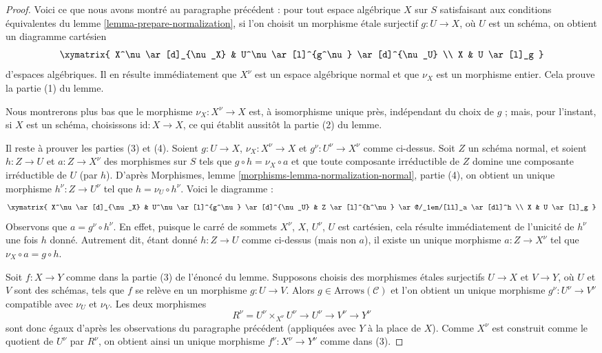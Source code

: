 \begin{proof}
\medskip\noindent
Voici ce que nous avons montré au paragraphe précédent : pour tout espace
algébrique $X$ sur $S$ satisfaisant aux conditions équivalentes du
lemme \ref{lemma-prepare-normalization}, si l'on choisit un morphisme étale
surjectif $g : U \to X$, où $U$ est un schéma, on obtient
un diagramme cartésien
$$
\xymatrix{
X^\nu \ar[d]_{\nu_X} & U^\nu \ar[l]^{g^\nu} \ar[d]^{\nu_U} \\
X & U \ar[l]_g
}
$$
d'espaces algébriques. Il en résulte immédiatement que $X^\nu$ est un espace
algébrique normal et que $\nu_X$ est un morphisme entier. Cela prouve
la partie (1) du lemme.

\medskip\noindent
Nous montrerons plus bas que le morphisme $\nu_X : X^\nu \to X$
est, à isomorphisme unique près, indépendant du choix de $g$ ;
mais, pour l'instant, si $X$ est un schéma, choisissons $\text{id} : X \to X$,
ce qui établit aussitôt la partie (2) du lemme.

\medskip\noindent
Il reste à prouver les parties (3) et (4). Soient $g : U \to X$,
$\nu_X : X^\nu \to X$ et $g^\nu : U^\nu \to X^\nu$ comme ci-dessus.
Soit $Z$ un schéma normal, et soient $h : Z \to U$ et $a : Z \to X^\nu$
des morphismes sur $S$ tels que $g \circ h = \nu_X \circ a$ et que
toute composante irréductible de $Z$ domine une composante irréductible de $U$
(par $h$). D'après
Morphismes, lemme \ref{morphisms-lemma-normalization-normal}, partie (4),
on obtient un unique morphisme $h^\nu : Z \to U^\nu$ tel
que $h = \nu_U \circ h^\nu$. Voici le diagramme :
$$
\xymatrix{
X^\nu \ar[d]_{\nu_X} &
U^\nu \ar[l]^{g^\nu} \ar[d]^{\nu_U} &
Z \ar[l]^{h^\nu} \ar@/_1em/[ll]_a \ar[dl]^h
\\
X & U \ar[l]_g
}
$$
Observons que $a = g^\nu \circ h^\nu$. En effet, puisque le carré de sommets
$X^\nu$, $X$, $U^\nu$, $U$ est cartésien, cela résulte
immédiatement de l'unicité de $h^\nu$ une fois $h$ donné.
Autrement dit, étant donné $h : Z \to U$ comme ci-dessus (mais non $a$),
il existe un unique morphisme $a : Z \to X^\nu$ tel que
$\nu_X \circ a = g \circ h$.

\medskip\noindent
Soit $f : X \to Y$ comme dans la partie (3) de l'énoncé du lemme.
Supposons choisis des morphismes étales surjectifs $U \to X$ et
$V \to Y$, où $U$ et $V$ sont des schémas, tels que $f$ se relève en un
morphisme $g : U \to V$. Alors $g \in \text{Arrows}(\mathcal{C})$
et l'on obtient un unique morphisme $g^\nu : U^\nu \to V^\nu$ compatible
avec $\nu_U$ et $\nu_V$. Les deux morphismes
$$
R^\nu = U^\nu \times_{X^\nu} U^\nu
\to U^\nu \to V^\nu \to Y^\nu
$$
sont donc égaux d'après les observations du paragraphe précédent (appliquées
avec $Y$ à la place de $X$).
Comme $X^\nu$ est construit comme le quotient de
$U^\nu$ par $R^\nu$, on obtient ainsi un unique
morphisme $f^\nu : X^\nu \to Y^\nu$ comme dans (3).


\end{proof}
